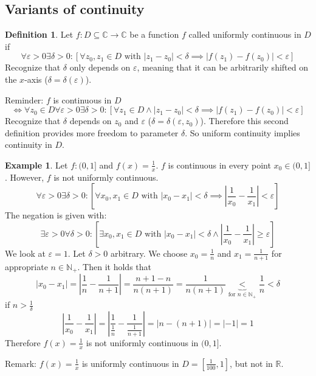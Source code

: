 \documentclass[a4paper,landscape,twocolumn]{article}
\theoremstyle{definition}
\newtheorem{defi}{Definition}
\newtheorem{ex}{Example}
\newcommand\abs[1]{\left|#1\right|}
\begin{document}
\subsection{Variants of continuity}
%
\begin{defi}
  Let $f: D \subseteq \mathbb C \to \mathbb C$ be a function $f$
  called uniformly continuous in $D$ if
  \[
    \forall \varepsilon > 0 \exists \delta > 0:
    \left[
      \forall z_0, z_1 \in D \text{ with } \abs{z_1 - z_0} < \delta
      \implies \abs{f(z_1) - f(z_0)} < \varepsilon
    \right]
  \]
  Recognize that $\delta$ only depends on $\varepsilon$,
  meaning that it can be arbitrarily shifted on the $x$-axis ($\delta = \delta(\varepsilon)$).

  Reminder: $f$ is continuous in $D$
  \[
    \iff \forall z_0 \in D \forall \varepsilon > 0 \exists \delta > 0:
    \left[
      \forall z_1 \in D \land \abs{z_1 - z_0} < \delta
      \implies \abs{f(z_1) - f(z_0)} < \varepsilon
    \right]
  \]
  Recognize that $\delta$ depends on $z_0$ and $\varepsilon$
  ($\delta = \delta(\varepsilon, z_0)$).
  Therefore this second definition provides more freedom to parameter $\delta$.
  So uniform continuity implies continuity in $D$.
\end{defi}
%
\begin{ex}
  Let $f: (0, 1]$ and $f(x) = \frac1x$.
  $f$ is continuous in every point $x_0 \in (0, 1]$.
  However, $f$ is not uniformly continuous.
  \[
    \forall \varepsilon > 0 \exists \delta > 0:
    \left[
      \forall x_0, x_1 \in D \text{ with } \abs{x_0 - x_1} < \delta
      \implies \abs{\frac1{x_0} - \frac1{x_1}} < \varepsilon
    \right]
  \]
  The negation is given with:
  \[
    \exists \varepsilon > 0 \forall \delta > 0:
    \left[
      \exists x_0, x_1 \in D \text{ with }
      \abs{x_0 - x_1} < \delta \land \abs{\frac1{x_0} - \frac1{x_1}} \geq \varepsilon
    \right]
  \]
  We look at $\varepsilon = 1$.
  Let $\delta > 0$ arbitrary. We choose $x_0 = \frac1n$ and $x_1 = \frac1{n+1}$
  for appropriate $n \in \mathbb N_+$. Then it holds that
  \[
    \abs{x_0 - x_1} = \abs{\frac1n - \frac1{n+1}} =
    \frac{n + 1 - n}{n (n + 1)} = \frac1{n (n + 1)}
    \underbrace{<}_{\text{for } n \in \mathbb N_+}
    \frac1n
    <
    \delta
  \]
  if $n > \frac1\delta$
  \[
    \abs{\frac1{x_0} - \frac1{x_1}}
    = \abs{\frac1{\frac1n} - \frac1{\frac1{n+1}}}
    = \abs{n - (n + 1)}
    = \abs{-1}
    = 1
  \]
  Therefore $f(x) = \frac1x$ is not uniformly continuous in $(0, 1]$.

  Remark: $f(x) = \frac1x$ is uniformly continuous in $D = [\frac1{100}, 1]$,
  but not in $\mathbb R$.
\end{ex}
\end{document}
